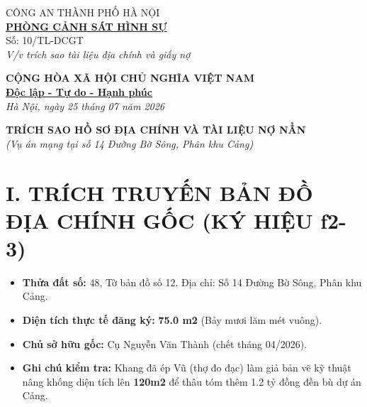 \documentclass[12pt,a4paper]{article}
\begin{document}
\noindent
\begin{minipage}[t]{0.45\textwidth}
    \begin{center}
        \small
        CÔNG AN THÀNH PHỐ HÀ NỘI\\
        \textbf{\underline{PHÒNG CẢNH SÁT HÌNH SỰ}}\\[0.1cm]
        Số: 10/TL-DCGT\\
        \textit{V/v trích sao tài liệu địa chính và giấy nợ}
    \end{center}
\end{minipage}
\hfill
\begin{minipage}[t]{0.52\textwidth}
    \begin{center}
        \small
        \textbf{CỘNG HÒA XÃ HỘI CHỦ NGHĨA VIỆT NAM}\\
        \textbf{\underline{Độc lập - Tự do - Hạnh phúc}}\\[0.1cm]
        \textit{Hà Nội, ngày 25 tháng 07 năm 2026}
    \end{center}
\end{minipage}

\vspace{0.6cm}

\begin{center}
    \textbf{\large TRÍCH SAO HỒ SƠ ĐỊA CHÍNH VÀ TÀI LIỆU NỢ NẦN}\\
    \textit{(Vụ án mạng tại số 14 Đường Bờ Sông, Phân khu Cảng)}
\end{center}

\vspace{0.3cm}

\section*{I. TRÍCH TRUYẾN BẢN ĐỒ ĐỊA CHÍNH GỐC (KÝ HIỆU f2-3)}
\begin{itemize}[leftmargin=1.5cm]
    \item \textbf{Thửa đất số:} 48, Tờ bản đồ số 12. Địa chỉ: Số 14 Đường Bờ Sông, Phân khu Cảng.
    \item \textbf{Diện tích thực tế đăng ký:} \textbf{75.0 m2} (Bảy mươi lăm mét vuông).
    \item \textbf{Chủ sở hữu gốc:} Cụ Nguyễn Văn Thành (chết tháng 04/2026).
    \item \textbf{Ghi chú kiểm tra:} Khang đã ép Vũ (thợ đo đạc) làm giả bản vẽ kỹ thuật nâng khống diện tích lên \textbf{120m2} để thâu tóm thêm 1.2 tỷ đồng đền bù dự án Cảng.
\end{itemize}
\end{document}
